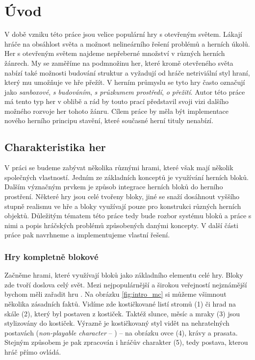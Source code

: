 
\chapter{Úvod}

V době vzniku této práce jsou velice populární hry s otevřeným světem. Lákají hráče na obsáhlost světa a možnost nelineárního řešení problémů a herních úkolů. Her s otevřeným světem najdeme nepřeberné množství v různých herních žánrech. My se zaměříme na podmnožinu her, které kromě otevřeného světa nabízí také možnosti budování struktur a vyžadují od hráče netriviální styl hraní, který mu umožňuje ve hře přežít. V herním průmyslu se tyto hry často označují jako \textit{sanboxové}, \textit{s budováním}, \textit{s průzkumem prostředí}, \textit{o přežití}. Autor této práce má tento typ her v oblibě a rád by touto prací představil svoji vizi dalšího možného rozvoje her tohoto žánru. Cílem práce by měla být implementace nového herního principu stavění, které současné herní tituly nenabízí.

\section{Charakteristika her}
V práci se budeme zabývat několika různými hrami, které však mají několik společných vlastností. Jedním ze základních konceptů je využívání herních bloků. Dalším význačným prvkem je způsob integrace herních bloků do herního prostření. Některé hry jsou celé tvořeny bloky, jiné se snaží dosáhnout vyššího stupně realismu ve hře a bloky využívají pouze pro konstrukci různých herních objektů. Důležitým tématem této práce tedy bude rozbor systému bloků a práce s nimi a popis hráčských problémů způsobených danými koncepty. V další části práce pak navrhneme a implementujeme vlastní řešení.




\subsection{Hry kompletně blokové}
Začněme hrami, které využívají bloků jako základního elementu celé hry. Bloky zde tvoří doslova celý svět. Mezi nejpopulárnější a širokou veřejností nejznámější bychom měli zařadit hru \MC{}. Na obrázku \ref{fig:intro_mc} si můžeme všimnout několika zásadních faktů. Vidíme zde kostičkované listí stromů (1) či hrad na skále (2), který byl postaven z kostiček. Taktéž slunce, měsíc a mraky (3) jsou stylizovány do kostiček. Výrazně je kostičkovaný styl vidět na nehratelných postavách (\textit{non-playable character} -- \NPC{}) -- na obrázku ovce (4), krávy a prasata. Stejným způsobem je pak zpracován i hráčův charakter (5), tedy postava, kterou hráč přímo ovládá.



